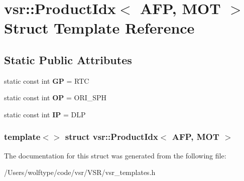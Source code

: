 \hypertarget{structvsr_1_1_product_idx_3_01_a_f_p_00_01_m_o_t_01_4}{\section{vsr\-:\-:Product\-Idx$<$ A\-F\-P, M\-O\-T $>$ Struct Template Reference}
\label{structvsr_1_1_product_idx_3_01_a_f_p_00_01_m_o_t_01_4}
}
\subsection*{Static Public Attributes}
\begin{DoxyCompactItemize}
\item 
\hypertarget{structvsr_1_1_product_idx_3_01_a_f_p_00_01_m_o_t_01_4_aa730db3821cc1f05f512b3f5912b9e35}{static const int {\bfseries G\-P} = R\-T\-C}\label{structvsr_1_1_product_idx_3_01_a_f_p_00_01_m_o_t_01_4_aa730db3821cc1f05f512b3f5912b9e35}

\item 
\hypertarget{structvsr_1_1_product_idx_3_01_a_f_p_00_01_m_o_t_01_4_a48929f1e5818d280bad12d9548cfb2eb}{static const int {\bfseries O\-P} = O\-R\-I\-\_\-\-S\-P\-H}\label{structvsr_1_1_product_idx_3_01_a_f_p_00_01_m_o_t_01_4_a48929f1e5818d280bad12d9548cfb2eb}

\item 
\hypertarget{structvsr_1_1_product_idx_3_01_a_f_p_00_01_m_o_t_01_4_a0322d7427dd7a4a481bc9088cda4c9e4}{static const int {\bfseries I\-P} = D\-L\-P}\label{structvsr_1_1_product_idx_3_01_a_f_p_00_01_m_o_t_01_4_a0322d7427dd7a4a481bc9088cda4c9e4}

\end{DoxyCompactItemize}
\subsubsection*{template$<$$>$ struct vsr\-::\-Product\-Idx$<$ A\-F\-P, M\-O\-T $>$}



The documentation for this struct was generated from the following file\-:\begin{DoxyCompactItemize}
\item 
/\-Users/wolftype/code/vsr/\-V\-S\-R/vsr\-\_\-templates.\-h\end{DoxyCompactItemize}
